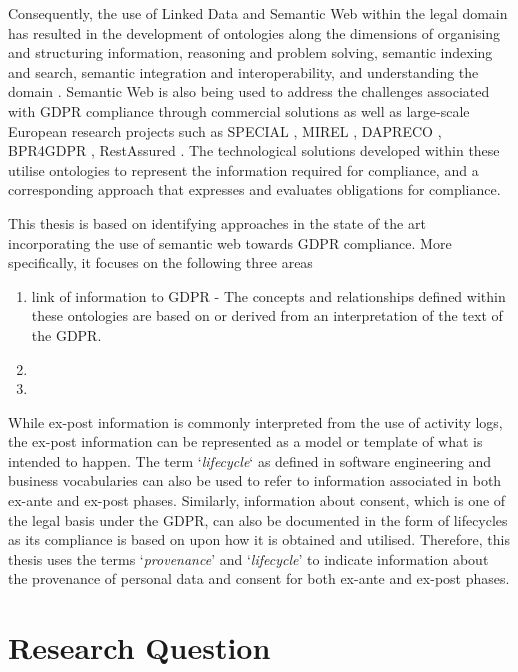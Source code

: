 Consequently, the use of Linked Data and Semantic Web within the legal domain has resulted in the development of ontologies along the dimensions of organising and structuring information, reasoning and problem solving, semantic indexing and search, semantic integration and interoperability, and understanding the domain \cite{rodrigues_legal_2019}.
Semantic Web is also being used to address the challenges associated with GDPR compliance through commercial solutions as well as large-scale European research projects such as SPECIAL \cite{noauthor_scalable_nodate}, MIREL \cite{noauthor_mirel_nodate}, DAPRECO \cite{noauthor_data_2018-1}, BPR4GDPR \cite{noauthor_bpr4gdpr_nodate}, RestAssured \cite{noauthor_restassured_nodate}.
The technological solutions developed within these utilise ontologies to represent the information required for compliance, and a corresponding approach that expresses and evaluates obligations for compliance.


This thesis is based on identifying approaches in the state of the art incorporating the use of semantic web towards GDPR compliance. More specifically, it focuses on the following three areas
\begin{enumerate}
    \item link of information to GDPR - The concepts and relationships defined within these ontologies are based on or derived from an interpretation of the text of the GDPR. 
    \item 
    \item 
\end{enumerate}

While ex-post information is commonly interpreted from the use of activity logs, the ex-post information can be represented as a model or template of what is intended to happen. The term `\textit{lifecycle}` as defined in software engineering and business vocabularies can also be used to refer to information associated in both ex-ante and ex-post phases. Similarly, information about consent, which is one of the legal basis under the GDPR,  can also be documented in the form of lifecycles as its compliance is based on upon how it is obtained and utilised. Therefore, this thesis uses the terms `\textit{provenance}' and `\textit{lifecycle}' to indicate information about the provenance of personal data and consent for both ex-ante and ex-post phases.

\section{Research Question}



